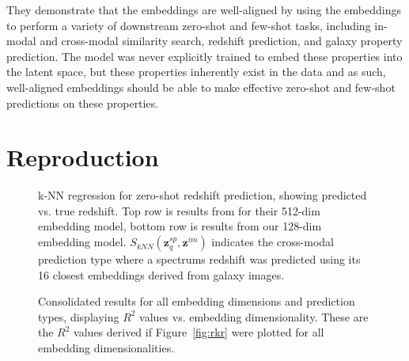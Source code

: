 \documentclass[a4paper,11pt]{article}
\begin{document}
They demonstrate that the embeddings are well-aligned by using the embeddings to perform a variety of downstream zero-shot
and few-shot tasks, including in-modal and cross-modal similarity search, redshift prediction, and galaxy property prediction.
The model was never explicitly trained to embed these properties into the latent space, but these properties inherently
exist in the data and as such, well-aligned embeddings should be able to make effective zero-shot and few-shot predictions
on these properties.

\section{Reproduction}\label{sec:reproduction}
\begin{figure}[t]
    \centering
    \caption{k-NN regression for zero-shot redshift prediction, showing predicted vs. true redshift.
    Top row is results from \cite{astroclip} for their 512-dim embedding model, bottom row is results from our 128-dim embedding
    model.
    $S_{kNN}(\mathbf{z}_{q}^{sp}, \mathbf{z}^{im})$ indicates the cross-modal prediction type where a spectrums redshift was
    predicted using its 16 closest embeddings derived from galaxy images.}
    \label{fig:rkr}
\end{figure}

\begin{figure}[t]
    \centering
    \caption{Consolidated results for all embedding dimensions and prediction types, displaying $R^{2}$ values vs. embedding dimensionality.
    These are the $R^{2}$ values derived if Figure~\eqref{fig:rkr} were plotted for all embedding dimensionalities.}
    \label{fig:r2_vs_embedding_dim}
\end{figure}
\end{document}
